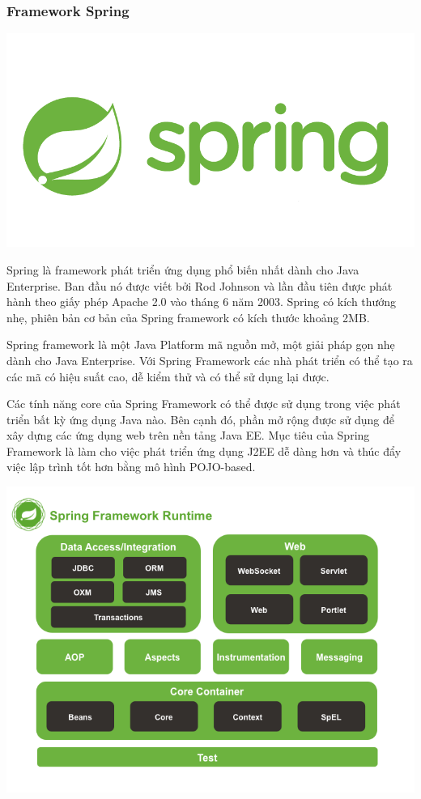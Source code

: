 \subsubsection{Framework Spring}
\begin{center}
  \captionsetup{type=figure}
  \includegraphics[width=15cm]{img/spring.png}
\end{center}

Spring là framework phát triển ứng dụng phổ biến nhất dành cho Java Enterprise. Ban đầu nó được viết bởi Rod Johnson và lần đầu tiên được phát hành theo giấy phép Apache 2.0 vào tháng 6 năm 2003. Spring có kích thướng nhẹ, phiên bản cơ bản của Spring framework có kích thước khoảng 2MB.

Spring framework là một Java Platform mã nguồn mở, một giải pháp gọn nhẹ dành cho Java Enterprise. Với Spring Framework các nhà phát triển có thể tạo ra các mã có hiệu suất cao, dễ kiểm thử và có thể sử dụng lại được.

Các tính năng core của Spring Framework có thể được sử dụng trong việc phát triển bất kỳ ứng dụng Java nào. Bên cạnh đó, phần mở rộng được sử dụng để xây dựng các ứng dụng web trên nền tảng Java EE. Mục tiêu của Spring Framework là làm cho việc phát triển ứng dụng J2EE dễ dàng hơn và thúc đẩy việc lập trình tốt hơn bằng mô hình POJO-based.
\begin{center}
  \captionsetup{type=figure}
  \includegraphics[width=15cm]{img/spring_runtime.png}
\end{center}

